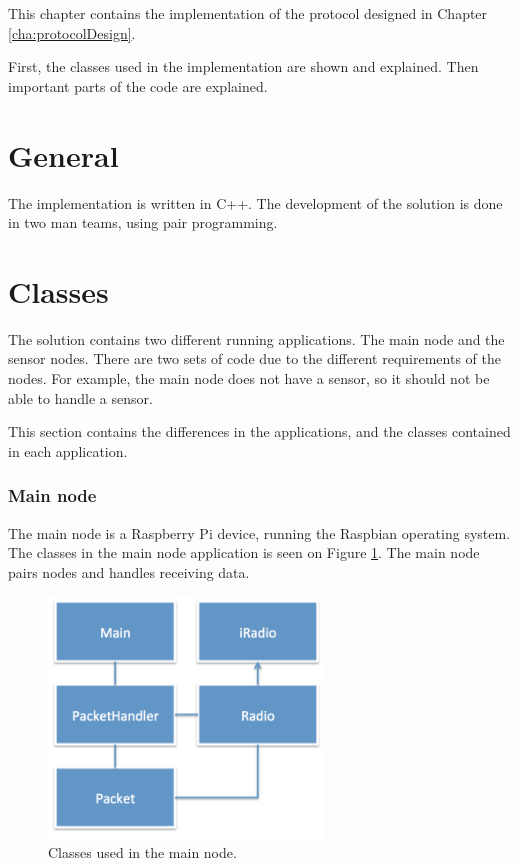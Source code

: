 This chapter contains the implementation of the protocol designed in Chapter \ref{cha:protocolDesign}. 

First, the classes used in the implementation are shown and explained. Then important parts of the code are explained.
 

\section{General}
The implementation is written in C++. The development of the solution is done in two man teams, using pair programming.

\section{Classes}
The solution contains two different running applications. The main node and the sensor nodes. There are two sets of code due to the different requirements of the nodes. For example, the main node does not have a sensor, so it should not be able to handle a sensor.

This section contains the differences in the applications, and the classes contained in each application.

\subsubsection*{Main node}
The main node is a Raspberry Pi device, running the Raspbian operating system. The classes in the main node application is seen on Figure \ref{fig:mainnodeClass}.
The main node pairs nodes and handles receiving data.

\begin{figure}[h!]
\centering
\includegraphics[width=0.65\textwidth]{chapters/implementation/figures/mainnodeClass.png}
\caption{Classes used in the main node.}
\label{fig:mainnodeClass}
\end{figure}



